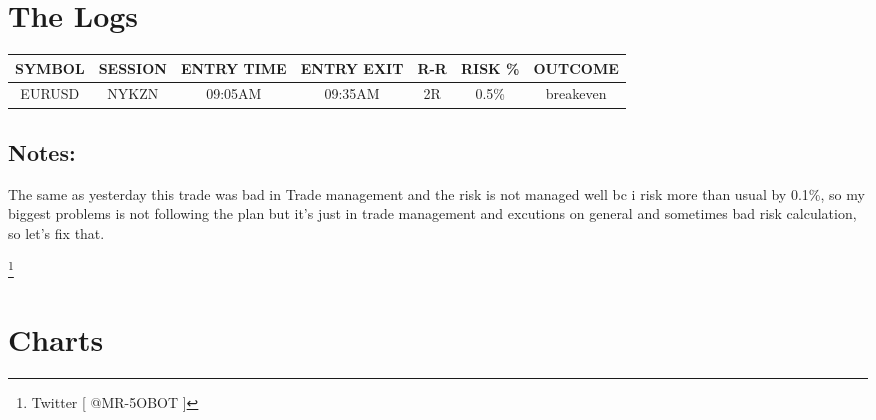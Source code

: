 \documentclass{article}
\begin{document}
\section{The Logs}
\vspace{0.3cm}

\renewcommand{\arraystretch}{1.5} %
\setlength{\tabcolsep}{10pt} %

\begin{center}
\begin{tabular}{|c|c|c|c|c|c|c|}
  \hline
  SYMBOL & SESSION & ENTRY TIME & ENTRY EXIT & R-R & RISK \% & OUTCOME \\ 
  \hline 
  EURUSD & NYKZN & 09:05AM & 09:35AM & 2R & 0.5\% & breakeven \\  
  \hline
\end{tabular}
\end{center}
\vspace{0.1cm}

\begin{notebox}
\subsection{Notes:}

\begin{notesbox}
\noindent The same as yesterday this trade was bad in Trade management and the risk is not managed well bc i risk more than usual by 0.1\%, so my biggest problems is not following the plan but it's just in trade management and excutions on general and sometimes bad risk calculation, so let's fix that.
\end{notesbox}
\end{notebox}

\footnote{Twitter [ @MR-5OBOT ]}
\newpage

\vspace{0.4cm}

\section{Charts}
\end{document}
